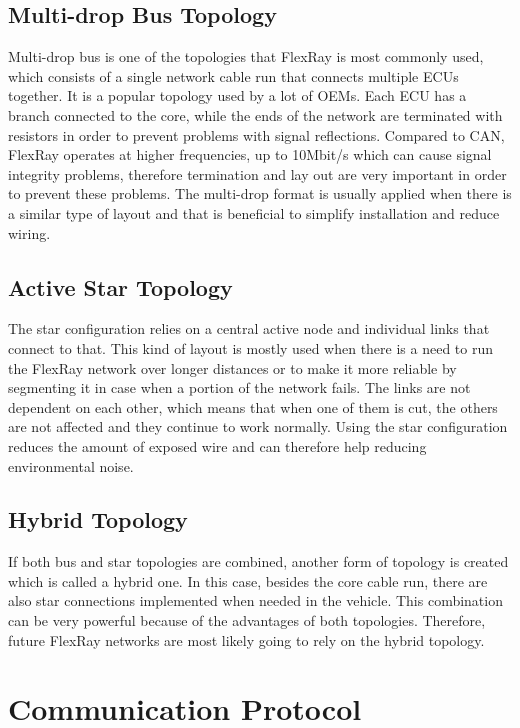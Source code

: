 \documentclass[conference]{IEEEtran}
\begin{document}
\subsection{Multi-drop Bus Topology}
Multi-drop bus is one of the topologies that FlexRay is most commonly used, which consists of a single network cable run that connects multiple ECUs together. It is a popular topology used by a lot of OEMs. Each ECU has a branch connected to the core, while the ends of the network are terminated with resistors in order to prevent problems with signal reflections. Compared to CAN, FlexRay operates at higher frequencies, up to 10Mbit/s which can cause signal integrity problems, therefore termination and lay out are very important in order to prevent these problems. The multi-drop format is usually applied when there is a similar type of layout and that is beneficial to simplify installation and reduce wiring.

\subsection{Active Star Topology}
The star configuration relies on a central active node and individual links that connect to that. This kind of layout is mostly used when there is a need to run the FlexRay network over longer distances or to make it more reliable by segmenting it in case when a portion of the network fails. The links are not dependent on each other, which means that when one of them is cut, the others are not affected and they continue to work normally. Using the star configuration reduces the amount of exposed wire and can therefore help reducing environmental noise.

\subsection{Hybrid Topology}
If both bus and star topologies are combined, another form of topology is created which is called a hybrid one. In this case, besides the core cable run, there are also star connections implemented when needed in the vehicle. This combination can be very powerful because of the advantages of both topologies. Therefore, future FlexRay networks are most likely going to rely on the hybrid topology.

\section{Communication Protocol}
\end{document}
